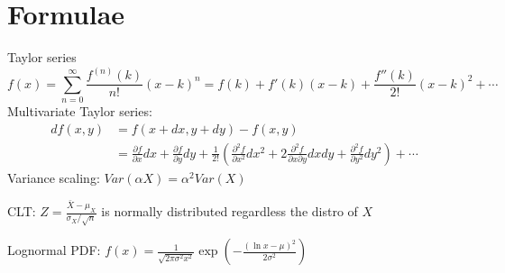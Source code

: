 \documentclass[9pt,twocolumn]{extarticle}
\begin{document}
\appendix

\section{Formulae}
Taylor series
$$ f(x) = \sum_{n=0}^\infty \frac{f^{(n)}(k)}{n!} (x-k)^n = f(k) + f'(k)(x-k) + \frac{f''(k)}{2!}(x-k)^2 + \cdots $$
Multivariate Taylor series:
\begin{align*}
df(x,y) &= f(x+dx,y+dy) - f(x,y) \\
        &=	\frac{\partial f}{\partial x}dx +
		 	\frac{\partial f}{\partial y}dy +
			\frac{1}{2!} \left(
				\frac{\partial^2 f}{\partial x^2}dx^2 +
				2\frac{\partial^2 f}{\partial x\partial y}dxdy +
				\frac{\partial^2 f}{\partial y^2}dy^2
			\right) + \cdots
\end{align*}
Variance scaling: $Var(\alpha X) = \alpha^2 Var(X)$

CLT: $\displaystyle Z=\frac{\bar{X}-\mu_X}{\sigma_X/\sqrt{n}}$ is normally distributed regardless the distro of $X$

Lognormal PDF: $\displaystyle f(x) = \frac{1}{\sqrt{2\pi\sigma^2x^2}}\exp\left(-\frac{(\ln x-\mu)^2}{2\sigma^2}\right)$
\end{document}
